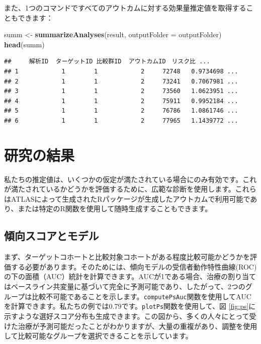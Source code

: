 \documentclass[
  11pt]{book}
\newenvironment{Shaded}{\begin{snugshade}}{\end{snugshade}}
\newcommand{\AttributeTok}[1]{\textcolor[rgb]{0.13,0.29,0.53}{#1}}
\newcommand{\FunctionTok}[1]{\textcolor[rgb]{0.13,0.29,0.53}{\textbf{#1}}}
\newcommand{\NormalTok}[1]{#1}
\newcommand{\OtherTok}[1]{\textcolor[rgb]{0.56,0.35,0.01}{#1}}
\theoremstyle{definition}
\theoremstyle{definition}
\theoremstyle{definition}
\theoremstyle{definition}
\theoremstyle{remark}
\begin{document}
また、1つのコマンドですべてのアウトカムに対する効果量推定値を取得することもできます：

\begin{Shaded}
\begin{Highlighting}[]
\NormalTok{summ }\OtherTok{\textless{}{-}} \FunctionTok{summarizeAnalyses}\NormalTok{(result, }\AttributeTok{outputFolder =}\NormalTok{ outputFolder)}
\FunctionTok{head}\NormalTok{(summ)}
\end{Highlighting}
\end{Shaded}

\begin{verbatim}
##     解析ID  ターゲットID 比較群ID  アウトカムID　リスク比 ...
## 1            1        1            2     72748   0.9734698 ...
## 2            1        1            2     73241   0.7067981 ...
## 3            1        1            2     73560   1.0623951 ...
## 4            1        1            2     75911   0.9952184 ...
## 5            1        1            2     76786   1.0861746 ...
## 6            1        1            2     77965   1.1439772 ...
\end{verbatim}

\section{研究の結果}\label{studyOutputs}

私たちの推定値は、いくつかの仮定が満たされている場合にのみ有効です。これが満たされているかどうかを評価するために、広範な診断を使用します。これらはATLASによって生成されたRパッケージが生成したアウトカムで利用可能であり、または特定のR関数を使用して随時生成することもできます。

\subsection{傾向スコアとモデル}\label{ux50beux5411ux30b9ux30b3ux30a2ux3068ux30e2ux30c7ux30eb}

まず、ターゲットコホートと比較対象コホートがある程度比較可能かどうかを評価する必要があります。そのためには、傾向モデルの受信者動作特性曲線(ROC)の下の面積（AUC）統計を計算できます。AUCが1である場合、治療の割り当てはベースライン共変量に基づいて完全に予測可能であり、したがって、2つのグループは比較不可能であることを示します。\texttt{computePsAuc}関数を使用してAUCを計算できます。私たちの例では0.79です。\texttt{plotPs}関数を使用して、図 \ref{fig:ps}に示すような選好スコア分布も生成できます。この図から、多くの人々にとって受けた治療が予測可能だったことがわかりますが、大量の重複があり、調整を使用して比較可能なグループを選択できることを示しています。 
\end{document}

